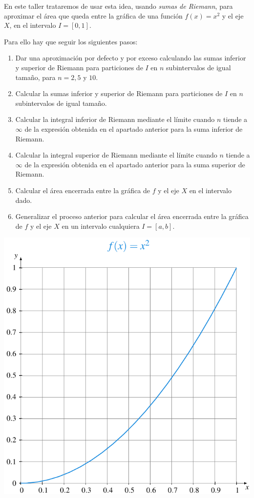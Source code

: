 \documentclass[
  a4paper,
]{scrreport}
\begin{document}
En este taller trataremos de usar esta idea, usando \emph{sumas de
Riemann}, para aproximar el área que queda entre la gráfica de una
función \(f(x)=x^2\) y el eje \(X\), en el intervalo \(I=[0,1]\).

Para ello hay que seguir los siguientes pasos:

\begin{enumerate}
\def\labelenumi{\arabic{enumi}.}
\item
  Dar una aproximación por defecto y por exceso calculando las sumas
  inferior y superior de Riemann para particiones de \(I\) en \(n\)
  subintervalos de igual tamaño, para \(n=2, 5\) y \(10\).
\item
  Calcular la sumas inferior y superior de Riemann para particiones de
  \(I\) en \(n\) subintervalos de igual tamaño.
\item
  Calcular la integral inferior de Riemann mediante el límite cuando
  \(n\) tiende a \(\infty\) de la expresión obtenida en el apartado
  anterior para la suma inferior de Riemann.
\item
  Calcular la integral superior de Riemann mediante el límite cuando
  \(n\) tiende a \(\infty\) de la expresión obtenida en el apartado
  anterior para la suma superior de Riemann.
\item
  Calcular el área encerrada entre la gráfica de \(f\) y el eje \(X\) en
  el intervalo dado.
\item
  Generalizar el proceso anterior para calcular el área encerrada entre
  la gráfica de \(f\) y el eje \(X\) en un intervalo cualquiera
  \(I=[a,b]\).
\end{enumerate}

\includegraphics{img/sumas-riemann/parabola-figure0.pdf}
\end{document}

